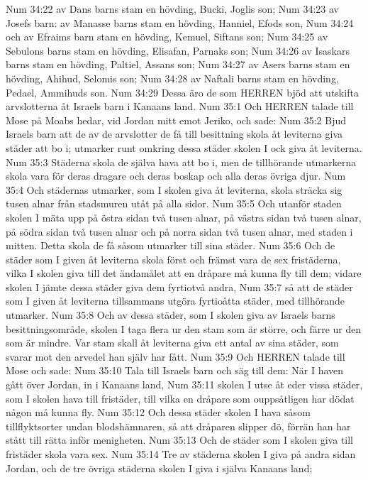 Num 34:22  av Dans barns stam en hövding, Bucki, Joglis son;
Num 34:23  av Josefs barn: av Manasse barns stam en hövding, Hanniel, Efods son,
Num 34:24  och av Efraims barn stam en hövding, Kemuel, Siftans son;
Num 34:25  av Sebulons barns stam en hövding, Elisafan, Parnaks son;
Num 34:26  av Isaskars barns stam en hövding, Paltiel, Assans son;
Num 34:27  av Asers barns stam en hövding, Ahihud, Selomis son;
Num 34:28  av Naftali barns stam en hövding, Pedael, Ammihuds son.
Num 34:29  Dessa äro de som HERREN bjöd att utskifta arvslotterna åt Israels barn i Kanaans land.
Num 35:1  Och HERREN talade till Mose på Moabs hedar, vid Jordan mitt emot Jeriko, och sade:
Num 35:2  Bjud Israels barn att de av de arvslotter de få till besittning skola åt leviterna giva städer att bo i; utmarker runt omkring dessa städer skolen I ock giva åt leviterna.
Num 35:3  Städerna skola de själva hava att bo i, men de tillhörande utmarkerna skola vara för deras dragare och deras boskap och alla deras övriga djur.
Num 35:4  Och städernas utmarker, som I skolen giva åt leviterna, skola sträcka sig tusen alnar från stadsmuren utåt på alla sidor.
Num 35:5  Och utanför staden skolen I mäta upp på östra sidan två tusen alnar, på västra sidan två tusen alnar, på södra sidan två tusen alnar och på norra sidan två tusen alnar, med staden i mitten. Detta skola de få såsom utmarker till sina städer.
Num 35:6  Och de städer som I given åt leviterna skola först och främst vara de sex fristäderna, vilka I skolen giva till det ändamålet att en dråpare må kunna fly till dem; vidare skolen I jämte dessa städer giva dem fyrtiotvå andra,
Num 35:7  så att de städer som I given åt leviterna tillsammans utgöra fyrtioåtta städer, med tillhörande utmarker.
Num 35:8  Och av dessa städer, som I skolen giva av Israels barns besittningsområde, skolen I taga flera ur den stam som är större, och färre ur den som är mindre. Var stam skall åt leviterna giva ett antal av sina städer, som svarar mot den arvedel han själv har fått.
Num 35:9  Och HERREN talade till Mose och sade:
Num 35:10  Tala till Israels barn och säg till dem: När I haven gått över Jordan, in i Kanaans land,
Num 35:11  skolen I utse åt eder vissa städer, som I skolen hava till fristäder, till vilka en dråpare som ouppsåtligen har dödat någon må kunna fly.
Num 35:12  Och dessa städer skolen I hava såsom tillflyktsorter undan blodshämnaren, så att dråparen slipper dö, förrän han har stått till rätta inför menigheten.
Num 35:13  Och de städer som I skolen giva till fristäder skola vara sex.
Num 35:14  Tre av städerna skolen I giva på andra sidan Jordan, och de tre övriga städerna skolen I giva i själva Kanaans land;
